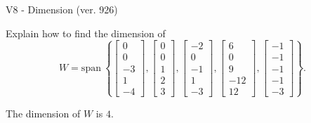 \begin{exercise}
  \begin{exerciseTitle}V8 - Dimension (ver. 926)\end{exerciseTitle}
  \begin{exerciseStatement}
    Explain how to find the dimension of 
\[W=\mathrm{span}\ \left\{\left[\begin{array}{r}
0 \\
0 \\
-3 \\
1 \\
-4
\end{array}\right] , \left[\begin{array}{r}
0 \\
0 \\
1 \\
2 \\
3
\end{array}\right] , \left[\begin{array}{r}
-2 \\
0 \\
-1 \\
1 \\
-3
\end{array}\right] , \left[\begin{array}{r}
6 \\
0 \\
9 \\
-12 \\
12
\end{array}\right] , \left[\begin{array}{r}
-1 \\
-1 \\
-1 \\
-1 \\
-3
\end{array}\right]\right\}.\]



  \end{exerciseStatement}
  \begin{exerciseAnswer}
   The dimension of \(W\) is  \(4\).
  


  \end{exerciseAnswer}
\end{exercise}